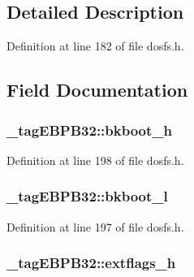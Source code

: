 \subsection{Detailed Description}


Definition at line 182 of file dosfs.\-h.



\subsection{Field Documentation}
\hypertarget{struct__tag_e_b_p_b32_a2b2ef870d9c060bba41caf53ef39b59f}{
\subsubsection[{bkboot\-\_\-h}]{ \-\_\-tag\-E\-B\-P\-B32\-::bkboot\-\_\-h}}\label{struct__tag_e_b_p_b32_a2b2ef870d9c060bba41caf53ef39b59f}


Definition at line 198 of file dosfs.\-h.

\hypertarget{struct__tag_e_b_p_b32_aa12cd4a091236a300d0d2bf35b3d8c62}{
\subsubsection[{bkboot\-\_\-l}]{ \-\_\-tag\-E\-B\-P\-B32\-::bkboot\-\_\-l}}\label{struct__tag_e_b_p_b32_aa12cd4a091236a300d0d2bf35b3d8c62}


Definition at line 197 of file dosfs.\-h.

\hypertarget{struct__tag_e_b_p_b32_abf867dd5ac5cfe091026932db11958be}{
\subsubsection[{extflags\-\_\-h}]{ \-\_\-tag\-E\-B\-P\-B32\-::extflags\-\_\-h}}\label{struct__tag_e_b_p_b32_abf867dd5ac5cfe091026932db11958be}



